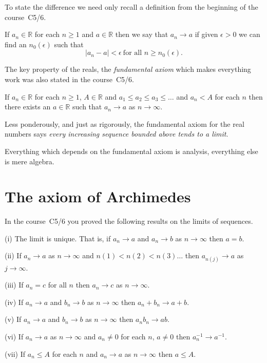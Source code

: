 To state the difference we need only recall a definition
from the beginning of the course~C5/6.
\begin{definition}\label{one convergence definition}
If $a_{n}\in{\mathbb R}$ for each $n\geq 1$
and $a\in{\mathbb R}$ then we say that $a_{n}\rightarrow a$
if given $\epsilon>0$ we can find an $n_{0}(\epsilon)$
such that
\[|a_{n}-a|<\epsilon\ \text{for all $n\geq n_{0}(\epsilon)$}.\]
\end{definition}
The key property of the reals, the \emph{fundamental axiom}
which makes everything work was also stated in 
the course~C5/6.
\begin{axiom}
If $a_{n}\in{\mathbb R}$ for each $n\geq 1$, $A\in{\mathbb R}$
and $a_{1}\leq a_{2}\leq a_{3}\leq \ldots$ and
$a_{n}<A$ for each $n$ then there exists an $a\in{\mathbb R}$
such that $a_{n}\rightarrow a$ as $n\rightarrow\infty$.
\end{axiom}
Less ponderously, and just as rigorously, the fundamental axiom
for the real numbers
says \emph{every increasing sequence bounded above tends
to a limit}.

Everything which depends on the fundamental axiom is
analysis, everything else is mere algebra.

\section{The axiom of Archimedes} In the course~C5/6 you
proved the following results on the limits of sequences.
\begin{lemma}\label{one sequences} 
(i) The limit is unique. That is, if $a_{n}\rightarrow a$
and $a_{n}\rightarrow b$ as $n\rightarrow\infty$
then $a=b$.

(ii) If $a_{n}\rightarrow a$ as $n\rightarrow\infty$
and $n(1)<n(2)<n(3)\ldots$ then
$a_{n(j)}\rightarrow a$ as $j\rightarrow\infty$.

(iii) If $a_{n}=c$ for all $n$ then $a_{n}\rightarrow c$
as $n\rightarrow\infty$.

(iv) If $a_{n}\rightarrow a$ and $b_{n}\rightarrow b$
as $n\rightarrow\infty$ then
$a_{n}+b_{n}\rightarrow a+b$.

(v) If $a_{n}\rightarrow a$ and $b_{n}\rightarrow b$
as $n\rightarrow\infty$ then
$a_{n}b_{n}\rightarrow ab$.

(vi) If $a_{n}\rightarrow a$
as $n\rightarrow\infty$ and $a_{n}\neq 0$ for each $n$,
$a\neq 0$ then $a_{n}^{-1}\rightarrow a^{-1}$.

(vii) If $a_{n}\leq A$ for each $n$ and
$a_{n}\rightarrow a$
as $n\rightarrow\infty$ then $a\leq A$.
\end{lemma}

